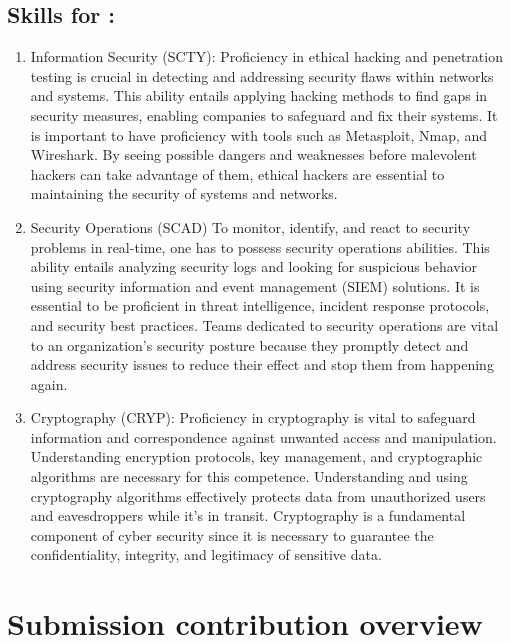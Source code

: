 \documentclass[a4paper, 11pt]{report}
\begin{document}
\subsection{Skills for \majD: \studD}

\begin{enumerate}

	\item Information Security (SCTY):
Proficiency in ethical hacking and penetration testing is crucial in detecting and addressing security flaws within networks and systems. This ability entails applying hacking methods to find gaps in security measures, enabling companies to safeguard and fix their systems. It is important to have proficiency with tools such as Metasploit, Nmap, and Wireshark. By seeing possible dangers and weaknesses before malevolent hackers can take advantage of them, ethical hackers are essential to maintaining the security of systems and networks.

	\item Security Operations (SCAD)
	To monitor, identify, and react to security problems in real-time, one has to possess security operations abilities. This ability entails analyzing security logs and looking for suspicious behavior using security information and event management (SIEM) solutions. It is essential to be proficient in threat intelligence, incident response protocols, and security best practices. Teams dedicated to security operations are vital to an organization's security posture because they promptly detect and address security issues to reduce their effect and stop them from happening again.

	\item Cryptography (CRYP):
Proficiency in cryptography is vital to safeguard information and correspondence against unwanted access and manipulation. Understanding encryption protocols, key management, and cryptographic algorithms are necessary for this competence. Understanding and using cryptography algorithms effectively protects data from unauthorized users and eavesdroppers while it's in transit. Cryptography is a fundamental component of cyber security since it is necessary to guarantee the confidentiality, integrity, and legitimacy of sensitive data.

\end{enumerate}



\newpage
\section{Submission contribution overview}
\end{document}
